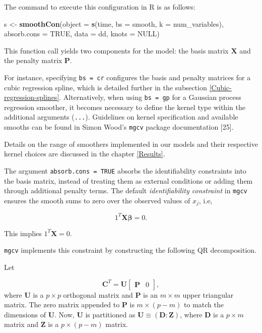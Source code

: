 \documentclass[
11pt, %
oneside, %
english, %
singlespacing, %
]{macthesis} %
\newenvironment{Shaded}{\begin{snugshade}}{\end{snugshade}}
\newcommand{\AttributeTok}[1]{\textcolor[rgb]{0.13,0.29,0.53}{#1}}
\newcommand{\ConstantTok}[1]{\textcolor[rgb]{0.56,0.35,0.01}{#1}}
\newcommand{\FunctionTok}[1]{\textcolor[rgb]{0.13,0.29,0.53}{\textbf{#1}}}
\newcommand{\NormalTok}[1]{#1}
\newcommand{\OtherTok}[1]{\textcolor[rgb]{0.56,0.35,0.01}{#1}}
\begin{document}
The command to execute this configuration in R is as follows:

\begin{Shaded}
\begin{Highlighting}[]
\NormalTok{    s }\OtherTok{\textless{}{-}} \FunctionTok{smoothCon}\NormalTok{(}\AttributeTok{object =} \FunctionTok{s}\NormalTok{(time, }\AttributeTok{bs =}\NormalTok{ smooth, }\AttributeTok{k =}\NormalTok{ num\_variables),}
                   \AttributeTok{absorb.cons =} \ConstantTok{TRUE}\NormalTok{, }\AttributeTok{data =}\NormalTok{ dd, }\AttributeTok{knots =} \ConstantTok{NULL}\NormalTok{)}
\end{Highlighting}
\end{Shaded}

This function call yields two components for the model: the basis matrix \(\mathbf{X}\) and the penalty matrix \(\mathbf{P}\).

For instance, specifying \texttt{bs\ =\ cr} configures the basis and penalty matrices for a cubic regression spline, which is detailed further in the subsection \ref{Cubic-regression-splines}. Alternatively, when using \texttt{bs\ =\ gp} for a Gaussian process regression smoother, it becomes necessary to define the kernel type within the additional arguments (\texttt{...}). Guidelines on kernel specification and available smooths can be found in Simon Wood's \texttt{mgcv} package documentation {[}25{]}.

Details on the range of smoothers implemented in our models and their respective kernel choices are discussed in the chapter \ref{Results}.

The argument \texttt{absorb.cons\ =\ TRUE} absorbs the identifiability constraints into the basis matrix, instead of treating them as external conditions or adding them through additional penalty terms. The default \emph{identifiability constraint} in \texttt{mgcv} ensures the smooth sums to zero over the observed values of \(x_j\), i.e,

\[
1^T\mathbf{X\beta} = 0.
\]

This implies \(1^T\mathbf{X} = 0\).

\texttt{mgcv} implements this constraint by constructing the following QR decomposition.

Let

\[ 
\mathbf{C}^T = \mathbf{U} \begin{bmatrix} \mathbf{P} & 0 \end{bmatrix}, 
\]
where \(\mathbf{U}\) is a \(p \times p\) orthogonal matrix and \(\mathbf{P}\) is an \(m \times m\) upper triangular matrix. The zero matrix appended to \(\mathbf{P}\) is \(m \times (p-m)\) to match the dimensions of \(\mathbf{U}\). Now, \(\mathbf{U}\) is partitioned as \(\mathbf{U} \equiv (\mathbf{D} : \mathbf{Z})\), where \(\mathbf{D}\) is a \(p \times m\) matrix and \(\mathbf{Z}\) is a \(p \times (p-m)\) matrix.
\end{document}
